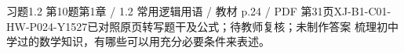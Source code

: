 \par\noindent\begin{minipage}{\linewidth}
\begin{bankitem}{习题1.2 第10题}{第1章 / 1.2 常用逻辑用语 / 教材 p.24 / PDF 第31页}{XJ-B1-C01-HW-P024-Y1527}{已对照原页转写题干及公式；待教师复核；未制作答案}
梳理初中学过的数学知识，有哪些可以用充分必要条件来表述。
\end{bankitem}
\end{minipage}\par\medskip
